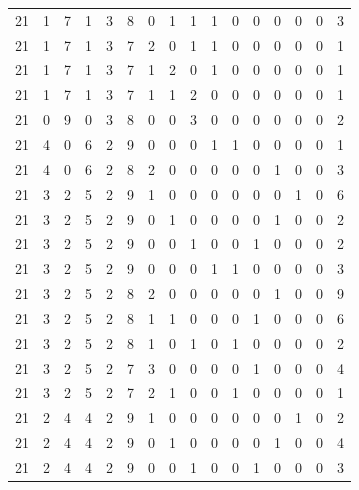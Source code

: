 \begin{appendix}
{\begin{longtable}{lrrrrrrrrrrrrrrr}
    21        & 1  & 7  & 1  & 3  & 8  & 0  & 1  & 1  & 1  & 0  & 0  & 0   & 0   & 0   & 3    \\
    21        & 1  & 7  & 1  & 3  & 7  & 2  & 0  & 1  & 1  & 0  & 0  & 0   & 0   & 0   & 1    \\
    21        & 1  & 7  & 1  & 3  & 7  & 1  & 2  & 0  & 1  & 0  & 0  & 0   & 0   & 0   & 1    \\
    21        & 1  & 7  & 1  & 3  & 7  & 1  & 1  & 2  & 0  & 0  & 0  & 0   & 0   & 0   & 1    \\
    21        & 0  & 9  & 0  & 3  & 8  & 0  & 0  & 3  & 0  & 0  & 0  & 0   & 0   & 0   & 2    \\
    21        & 4  & 0  & 6  & 2  & 9  & 0  & 0  & 0  & 1  & 1  & 0  & 0   & 0   & 0   & 1    \\
    21        & 4  & 0  & 6  & 2  & 8  & 2  & 0  & 0  & 0  & 0  & 0  & 1   & 0   & 0   & 3    \\
    21        & 3  & 2  & 5  & 2  & 9  & 1  & 0  & 0  & 0  & 0  & 0  & 0   & 1   & 0   & 6    \\
    21        & 3  & 2  & 5  & 2  & 9  & 0  & 1  & 0  & 0  & 0  & 0  & 1   & 0   & 0   & 2    \\
    21        & 3  & 2  & 5  & 2  & 9  & 0  & 0  & 1  & 0  & 0  & 1  & 0   & 0   & 0   & 2    \\
    21        & 3  & 2  & 5  & 2  & 9  & 0  & 0  & 0  & 1  & 1  & 0  & 0   & 0   & 0   & 3    \\
    21        & 3  & 2  & 5  & 2  & 8  & 2  & 0  & 0  & 0  & 0  & 0  & 1   & 0   & 0   & 9    \\
    21        & 3  & 2  & 5  & 2  & 8  & 1  & 1  & 0  & 0  & 0  & 1  & 0   & 0   & 0   & 6    \\
    21        & 3  & 2  & 5  & 2  & 8  & 1  & 0  & 1  & 0  & 1  & 0  & 0   & 0   & 0   & 2    \\
    21        & 3  & 2  & 5  & 2  & 7  & 3  & 0  & 0  & 0  & 0  & 1  & 0   & 0   & 0   & 4    \\
    21        & 3  & 2  & 5  & 2  & 7  & 2  & 1  & 0  & 0  & 1  & 0  & 0   & 0   & 0   & 1    \\
    21        & 2  & 4  & 4  & 2  & 9  & 1  & 0  & 0  & 0  & 0  & 0  & 0   & 1   & 0   & 2    \\
    21        & 2  & 4  & 4  & 2  & 9  & 0  & 1  & 0  & 0  & 0  & 0  & 1   & 0   & 0   & 4    \\
    21        & 2  & 4  & 4  & 2  & 9  & 0  & 0  & 1  & 0  & 0  & 1  & 0   & 0   & 0   & 3    \\

\end{longtable}}
\end{appendix}
